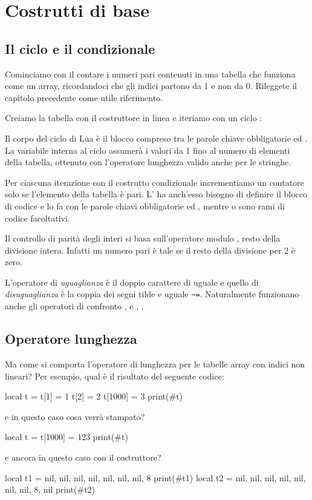 

\chapter{Costrutti di base}

\section{Il ciclo  e il condizionale }
\label{secFondCicloIf}

Cominciamo con il contare i numeri pari contenuti in una tabella che funziona
come un array, ricordandoci che gli indici partono da 1 e non da 0. Rileggete
il capitolo precedente come utile riferimento.

Creiamo la tabella con il costruttore in linea e iteriamo con un ciclo
:

Il corpo del ciclo  di Lua è il blocco compreso tra le parole
chiave obbligatorie  ed . La variabile  interna
al ciclo assumerà i valori da 1 fino al numero di elementi della tabella,
ottenuto con l'operatore lunghezza \key{\#} valido anche per le stringhe.

Per ciascuna iterazione con il costrutto condizionale 
incrementiamo un contatore solo se l'elemento della tabella è pari. L'
ha anch'esso bisogno di definire il blocco di codice e lo fa con le parole
chiavi obbligatorie  ed , mentre
 o  sono rami di codice
facoltativi.

Il controllo di parità degli interi si basa sull'operatore modulo
\key{\%}\luas{\%}, resto della divisione intera. Infatti un numero pari è tale
se il resto della divisione per 2 è zero. 

L'operatore di \emph{uguaglianza} è il doppio carattere di uguale
\key{==}\luas{==} e quello di \emph{disuguaglianza} è la coppia dei segni tilde
e uguale \verb|~=|\luas{~=}. Naturalmente funzionano anche gli operatori di
confronto \key{>}\luas{>}, \key{>=}\luas{>=} e \key{<}\luas{<},
\key{<=}\luas{<=}.


\section{Operatore lunghezza}
\label{secFondLenOperator}

Ma come si comporta l'operatore di lunghezza \key{\#}\luas{\#} per le
tabelle array con indici non lineari? Per esempio, qual è il risultato del
seguente codice:
\begin{lines}
local t = {}
t[1] = 1
t[2] = 2
t[1000] = 3
print(#t)
\end{lines}
e in questo caso cosa verrà stampato?
\begin{lines}
local t = {}
t[1000] = 123
print(#t)
\end{lines}
e ancora in questo caso con il costruttore?
\begin{lines}
local t1 = {nil, nil,  nil, nil, nil, nil, nil, 8}
print(#t1)
local t2 = {nil, nil,  nil, nil, nil, nil, nil, 8, nil}
print(#t2)
\end{lines}

